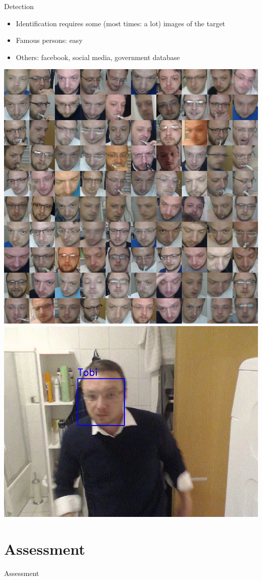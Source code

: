\documentclass[aspectratio=169]{beamer}
\begin{document}
\begin{frame}{Detection}
	\begin{itemize}
		\item Identification requires some (most times: a lot) images of the target
		\item Famous persons: easy
		\item Others: facebook, social media, government database
	\end{itemize}
	\includegraphics[width=.35\textwidth]{images/mosaic_tobi.png}
	\hspace{1cm}
    \href{run:./videos/face_recog_new.mp4?autostart}
    {\includegraphics[width=.49\linewidth]{images/face_recog.png}}	
\end{frame}

\section{Assessment}
\begin{frame}{Assessment}
\end{frame}
\end{document}
